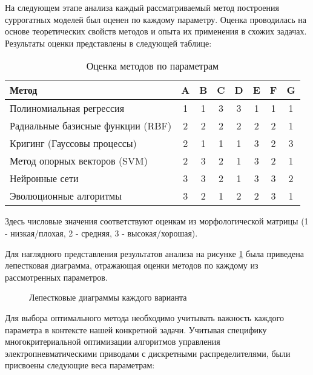 На следующем этапе анализа каждый рассматриваемый метод
построения суррогатных моделей был оценен по каждому параметру.
Оценка проводилась на основе теоретических свойств методов и опыта
их применения в схожих задачах. Результаты оценки представлены в следующей таблице:

\begin{table}[h]
    \centering
    \caption{Оценка методов по параметрам}
    \begin{tabular}{l|c|c|c|c|c|c|c}
        \midrule
        Метод                             & A & B & C & D & E & F & G \\
        \midrule
        Полиномиальная регрессия          & 1 & 1 & 3 & 3 & 1 & 1 & 1 \\
        \hline
        Радиальные базисные функции (RBF) & 2 & 2 & 2 & 2 & 2 & 2 & 1 \\
        \hline
        Кригинг (Гауссовы процессы)       & 2 & 1 & 1 & 1 & 3 & 2 & 3 \\
        \hline
        Метод опорных векторов (SVM)      & 2 & 3 & 2 & 1 & 3 & 2 & 1 \\
        \hline
        Нейронные сети                    & 3 & 3 & 2 & 1 & 3 & 3 & 2 \\
        \hline
        Эволюционные алгоритмы            & 3 & 2 & 1 & 2 & 2 & 3 & 1 \\
        \midrule
    \end{tabular}
    \label{tab:method_evaluation}
\end{table}

Здесь числовые значения соответствуют оценкам из
морфологической матрицы (1 - низкая/плохая, 2 - средняя, 3 - высокая/хорошая).

Для наглядного представления результатов анализа на рисунке \ref{fig:morphological_analysis}
была приведена лепестковая диаграмма, отражающая оценки методов по каждому из
рассмотренных параметров.

\begin{figure}[ht]
    \caption{Лепестковые диаграммы каждого варианта}\label{fig:morphological_analysis}
\end{figure}

Для выбора оптимального метода необходимо учитывать важность
каждого параметра в контексте нашей конкретной задачи.
Учитывая специфику многокритериальной оптимизации алгоритмов
управления электропневматическими приводами с дискретными
распределителями, были присвоены следующие веса параметрам:

